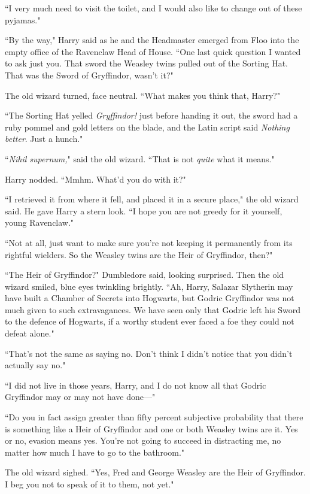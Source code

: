 ``I very much need to visit the toilet, and I would also like to change out of these pyjamas."

\later

``By the way," Harry said as he and the Headmaster emerged from Floo into the empty office of the Ravenclaw Head of House. ``One last quick question I wanted to ask just you. That sword the Weasley twins pulled out of the Sorting Hat. That was the Sword of Gryffindor, wasn't it?"

The old wizard turned, face neutral. ``What makes you think that, Harry?"

``The Sorting Hat yelled \emph{Gryffindor!} just before handing it out, the sword had a ruby pommel and gold letters on the blade, and the Latin script said \emph{Nothing better}. Just a hunch."

``\emph{Nihil supernum,}" said the old wizard. ``That is not \emph{quite} what it means."

Harry nodded. ``Mmhm. What'd you do with it?"

``I retrieved it from where it fell, and placed it in a secure place," the old wizard said. He gave Harry a stern look. ``I hope you are not greedy for it yourself, young Ravenclaw."

``Not at all, just want to make sure you're not keeping it permanently from its rightful wielders. So the Weasley twins are the Heir of Gryffindor, then?"

``The Heir of Gryffindor?" Dumbledore said, looking surprised. Then the old wizard smiled, blue eyes twinkling brightly. ``Ah, Harry, Salazar Slytherin may have built a Chamber of Secrets into Hogwarts, but Godric Gryffindor was not much given to such extravagances. We have seen only that Godric left his Sword to the defence of Hogwarts, if a worthy student ever faced a foe they could not defeat alone."

``That's not the same as saying no. Don't think I didn't notice that you didn't actually say no."

``I did not live in those years, Harry, and I do not know all that Godric Gryffindor may or may not have done—"

``Do you in fact assign greater than fifty percent subjective probability that there is something like a Heir of Gryffindor and one or both Weasley twins are it. Yes or no, evasion means yes. You're not going to succeed in distracting me, no matter how much I have to go to the bathroom."

The old wizard sighed. ``Yes, Fred and George Weasley are the Heir of Gryffindor. I beg you not to speak of it to them, not yet."

